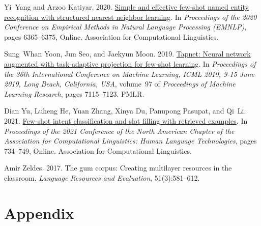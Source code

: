 \documentclass[11pt]{article}
\begin{document}
\begin{thebibliography}{45}
Yi~Yang and Arzoo Katiyar. 2020.
\newblock \href {https://doi.org/10.18653/v1/2020.emnlp-main.516} {Simple and
  effective few-shot named entity recognition with structured nearest neighbor
  learning}.
\newblock In \emph{Proceedings of the 2020 Conference on Empirical Methods in
  Natural Language Processing (EMNLP)}, pages 6365--6375, Online. Association
  for Computational Linguistics.

Sung~Whan Yoon, Jun Seo, and Jaekyun Moon. 2019.
\newblock \href {http://proceedings.mlr.press/v97/yoon19a.html} {Tapnet: Neural
  network augmented with task-adaptive projection for few-shot learning}.
\newblock In \emph{Proceedings of the 36th International Conference on Machine
  Learning, {ICML} 2019, 9-15 June 2019, Long Beach, California, {USA}},
  volume~97 of \emph{Proceedings of Machine Learning Research}, pages
  7115--7123. {PMLR}.

Dian Yu, Luheng He, Yuan Zhang, Xinya Du, Panupong Pasupat, and Qi~Li. 2021.
\newblock \href {https://doi.org/10.18653/v1/2021.naacl-main.59} {Few-shot
  intent classification and slot filling with retrieved examples}.
\newblock In \emph{Proceedings of the 2021 Conference of the North American
  Chapter of the Association for Computational Linguistics: Human Language
  Technologies}, pages 734--749, Online. Association for Computational
  Linguistics.

Amir Zeldes. 2017.
\newblock The gum corpus: Creating multilayer resources in the classroom.
\newblock \emph{Language Resources and Evaluation}, 51(3):581--612.

\end{thebibliography}
 

\newpage
\appendix



\section{Appendix}
\end{document}
